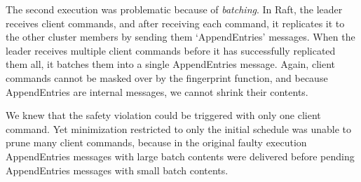 %
%


The second execution was problematic because of {\em batching}. In
Raft, the leader receives client commands, and after receiving each
command, it replicates it to the other
cluster members by sending them `AppendEntries' messages. When the leader receives multiple client commands
before it has successfully replicated them all, it batches them
into a single AppendEntries message. %
Again, client commands cannot be masked over by the fingerprint function, and
because AppendEntries are internal messages, we cannot shrink their
contents.

We knew that the safety violation
could be triggered with only one client command.
Yet minimization restricted to only the initial schedule was unable to prune many client
commands, because in the original faulty execution AppendEntries
messages with large batch contents were delivered before pending
AppendEntries messages with small batch contents.


